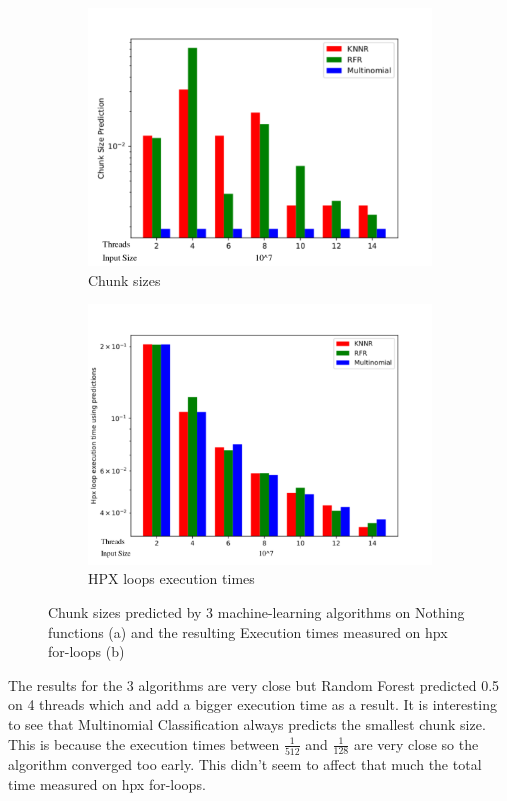 \begin{figure}[h]
	\centering
	\begin{subfigure}[b]{0.5\textwidth}
		\centering
		\includegraphics[width=\textwidth]{images/bars_nothing_cs.pdf}
		\caption[Network2]%
		{{Chunk sizes}}    
	\end{subfigure}
	\hfill
	\begin{subfigure}[b]{0.49\textwidth}  
		\centering 
		\includegraphics[width=\textwidth]{images/bars_nothing_times.pdf}
		\caption[]%
		{{HPX loops execution times}}    
	\end{subfigure}
	\caption{Chunk sizes predicted by 3 machine-learning algorithms on Nothing functions (a) and the resulting Execution times measured on hpx for-loops (b)} 	
\end{figure}
The results for the 3 algorithms are very close but Random Forest predicted 0.5 on 4 threads which and add a bigger execution time as a result. It is interesting to see that Multinomial Classification always predicts the smallest chunk size. This is because the execution times between $\frac{1}{512}$ and $\frac{1}{128}$ are very close so the algorithm converged too early. This didn't seem to affect that much the total time measured on hpx for-loops.
\newpage
